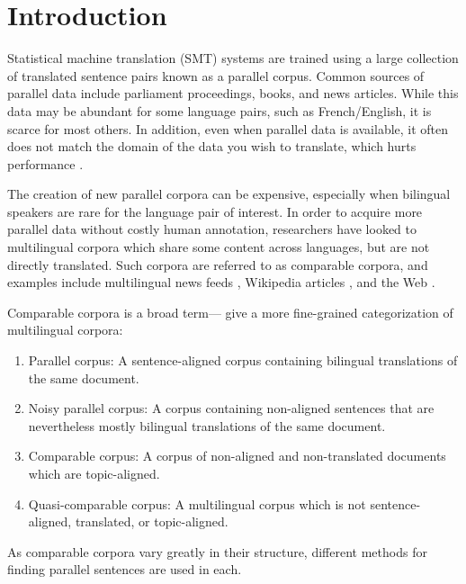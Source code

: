 \chapter{Introduction}
\label{chap:intro}

Statistical machine translation (SMT) systems are trained using a large collection of translated
sentence pairs known as a parallel corpus. Common sources of parallel data include
parliament proceedings, books, and news articles.
While this data may be abundant for some language pairs, such as
French/English, it is scarce for most others. In addition, even when parallel
data is available, it often does not match the domain of the data you wish to
translate, which hurts performance \citep{Munteanu05}.

The creation of new parallel corpora can be expensive, especially when bilingual
speakers are rare for the language pair of interest.
In order to acquire more parallel data without costly human annotation,
researchers have looked to multilingual corpora which share some content across languages,
but are not directly translated. Such corpora are referred to as comparable
corpora, and examples include multilingual news feeds \citep{Munteanu05},
Wikipedia articles \citep{Adafre06,Smith10}, and the Web
\citep{Resnik99,Nie99,Chen00}. 

Comparable corpora is a broad term---\citet{Fung04a} give a more
fine-grained categorization of multilingual corpora:
\begin{enumerate}
\item Parallel corpus: A sentence-aligned corpus containing bilingual
translations of the same document.
\item Noisy parallel corpus: A corpus containing non-aligned sentences that are
nevertheless mostly bilingual translations of the same document.
\item Comparable corpus: A corpus of non-aligned and non-translated documents
which are topic-aligned.
\item Quasi-comparable corpus: A multilingual corpus which is not
sentence-aligned, translated, or topic-aligned.
\end{enumerate}
As comparable corpora vary greatly in their structure, different methods for finding
parallel sentences are used in each.

